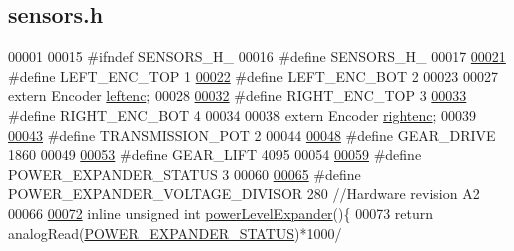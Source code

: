 \hypertarget{sensors_8h_source}{}\subsection{sensors.\+h}
\label{sensors_8h_source}

\begin{DoxyCode}
00001 
00015 \textcolor{preprocessor}{#ifndef SENSORS\_H\_}
00016 \textcolor{preprocessor}{#define SENSORS\_H\_}
00017 
\hypertarget{sensors_8h_source.tex_l00021}{}\hyperlink{sensors_8h_ad0ae0aded49835e75c52bc506585f5a6}{00021} \textcolor{preprocessor}{#define LEFT\_ENC\_TOP 1}
\hypertarget{sensors_8h_source.tex_l00022}{}\hyperlink{sensors_8h_ae913e0b80ef027d0a619e59a3d2ffb85}{00022} \textcolor{preprocessor}{#define LEFT\_ENC\_BOT 2}
00023 
00027 \textcolor{keyword}{extern} Encoder \hyperlink{sensors_8h_a48ead63071a2b65b87a166928a5a5c08}{leftenc};
00028 
\hypertarget{sensors_8h_source.tex_l00032}{}\hyperlink{sensors_8h_a07c1c0ceab9fee6088955b2b2706e515}{00032} \textcolor{preprocessor}{#define RIGHT\_ENC\_TOP 3}
\hypertarget{sensors_8h_source.tex_l00033}{}\hyperlink{sensors_8h_a76290ef36d8c093e1d380e26d1d01f6a}{00033} \textcolor{preprocessor}{#define RIGHT\_ENC\_BOT 4}
00034 
00038 \textcolor{keyword}{extern} Encoder \hyperlink{sensors_8h_a8c853ba918673c4878ab6935c54969e4}{rightenc};
00039 
\hypertarget{sensors_8h_source.tex_l00043}{}\hyperlink{sensors_8h_a4df8b77c0d00d0604d3e8d0fd5fa5d40}{00043} \textcolor{preprocessor}{#define TRANSMISSION\_POT 2}
00044 
\hypertarget{sensors_8h_source.tex_l00048}{}\hyperlink{sensors_8h_aaaba487ef4204a2d1755d80994bb04ca}{00048} \textcolor{preprocessor}{#define GEAR\_DRIVE 1860}
00049 
\hypertarget{sensors_8h_source.tex_l00053}{}\hyperlink{sensors_8h_a3b1b936537462c395fee9c9785dfc9a1}{00053} \textcolor{preprocessor}{#define GEAR\_LIFT 4095}
00054 
\hypertarget{sensors_8h_source.tex_l00059}{}\hyperlink{sensors_8h_a0f128e79b5e93af55f4b30b0bedcea3f}{00059} \textcolor{preprocessor}{#define POWER\_EXPANDER\_STATUS 3}
00060 
\hypertarget{sensors_8h_source.tex_l00065}{}\hyperlink{sensors_8h_a3fbd303e783c833bf2812682e0905188}{00065} \textcolor{preprocessor}{#define POWER\_EXPANDER\_VOLTAGE\_DIVISOR 280 //Hardware revision A2}
00066 
\hypertarget{sensors_8h_source.tex_l00072}{}\hyperlink{sensors_8h_af8de9fe9eba1282f34dce42deebffc93}{00072} \textcolor{keyword}{inline} \textcolor{keywordtype}{unsigned} \textcolor{keywordtype}{int} \hyperlink{sensors_8h_af8de9fe9eba1282f34dce42deebffc93}{powerLevelExpander}()\{
00073     \textcolor{keywordflow}{return} analogRead(\hyperlink{sensors_8h_a0f128e79b5e93af55f4b30b0bedcea3f}{POWER\_EXPANDER\_STATUS})*1000/

\end{DoxyCode}
